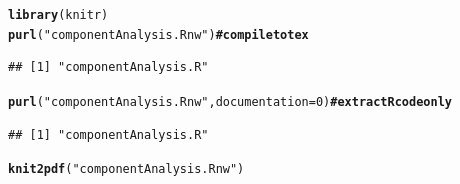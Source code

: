 \documentclass{article}\usepackage[]{graphicx}\usepackage[]{color}
\makeatletter
\newcommand{\hlnum}[1]{\textcolor[rgb]{0.686,0.059,0.569}{#1}}%
\newcommand{\hlstr}[1]{\textcolor[rgb]{0.192,0.494,0.8}{#1}}%
\newcommand{\hlcom}[1]{\textcolor[rgb]{0.678,0.584,0.686}{\textit{#1}}}%
\newcommand{\hlstd}[1]{\textcolor[rgb]{0.345,0.345,0.345}{#1}}%
\newcommand{\hlkwc}[1]{\textcolor[rgb]{0.333,0.667,0.333}{#1}}%
\newcommand{\hlkwd}[1]{\textcolor[rgb]{0.737,0.353,0.396}{\textbf{#1}}}%
\newenvironment{kframe}{%
 \def\at@end@of@kframe{}%
 \ifinner\ifhmode%
  \def\at@end@of@kframe{\end{minipage}}%
  \begin{minipage}{\columnwidth}%
 \fi\fi%
 \def\FrameCommand##1{\hskip\@totalleftmargin \hskip-\fboxsep
 \colorbox{shadecolor}{##1}\hskip-\fboxsep
     \hskip-\linewidth \hskip-\@totalleftmargin \hskip\columnwidth}%
 \MakeFramed {\advance\hsize-\width
   \@totalleftmargin\z@ \linewidth\hsize
   \@setminipage}}%
 {\par\unskip\endMakeFramed%
 \at@end@of@kframe}
\newenvironment{knitrout}{}{} %
\renewcommand{\hlcom}[1]{\textcolor[rgb]{0.678,0.584,0.686}{\textbf{#1}}}%
\makeatother
\begin{document}
\begin{knitrout}
\color{fgcolor}\begin{kframe}
\begin{alltt}
\hlkwd{library}\hlstd{(knitr)}
\hlkwd{purl}\hlstd{(}\hlstr{"componentAnalysis.Rnw"} \hlstd{)} \hlcom{# compile to tex}
\end{alltt}
\begin{verbatim}
## [1] "componentAnalysis.R"
\end{verbatim}
\begin{alltt}
\hlkwd{purl}\hlstd{(}\hlstr{"componentAnalysis.Rnw"}\hlstd{,} \hlkwc{documentation} \hlstd{=} \hlnum{0}\hlstd{)} \hlcom{# extract R code only}
\end{alltt}
\begin{verbatim}
## [1] "componentAnalysis.R"
\end{verbatim}
\begin{alltt}
\hlkwd{knit2pdf}\hlstd{(}\hlstr{"componentAnalysis.Rnw"}\hlstd{)}
\end{alltt}


{\ttfamily\noindent\bfseries\color{errorcolor}{\#\# Error: duplicate label 'setup'}}\end{kframe}
\end{knitrout}
\end{document}
